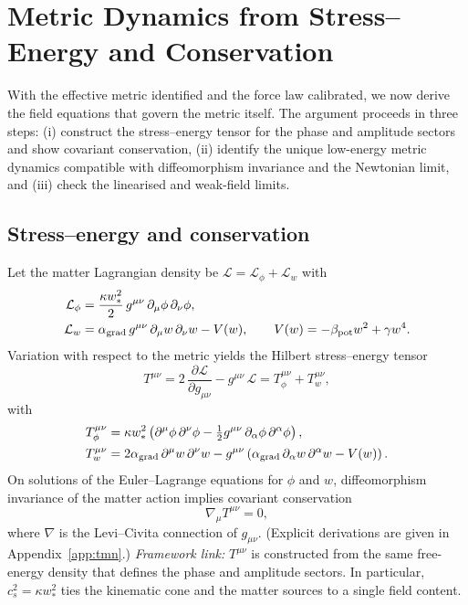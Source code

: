\documentclass[11pt]{article}
\begin{document}
\section{Metric Dynamics from Stress--Energy and Conservation}
With the effective metric identified and the force law calibrated, we now derive the field equations that govern the metric itself. The argument proceeds in three steps: (i) construct the stress--energy tensor for the phase and amplitude sectors and show covariant conservation, (ii) identify the unique low-energy metric dynamics compatible with diffeomorphism invariance and the Newtonian limit, and (iii) check the linearised and weak-field limits.

\subsection{Stress--energy and conservation}
Let the matter Lagrangian density be $\mathcal L=\mathcal L_\phi+\mathcal L_w$ with
\begin{align}
  \mathcal L_\phi &= \frac{\kappa w_*^2}{2}\,g^{\mu\nu}\,\partial_\mu\phi\,\partial_\nu\phi,\\
  \mathcal L_w &= \alpha_{\rm grad}\,g^{\mu\nu}\,\partial_\mu w\,\partial_\nu w - V(w),\qquad V(w)=-\beta_{\rm pot}w^2+\gamma w^4.
\end{align}
Variation with respect to the metric yields the Hilbert stress--energy tensor
\begin{equation}
  T^{\mu\nu} = 2\,\frac{\partial \mathcal L}{\partial g_{\mu\nu}} - g^{\mu\nu}\,\mathcal L 
  = T^{\mu\nu}_{\phi}+T^{\mu\nu}_{w},
\end{equation}
with
\begin{align}
  T^{\mu\nu}_{\phi} &= \kappa w_*^2\left(\partial^{\mu}\phi\,\partial^{\nu}\phi - \tfrac12 g^{\mu\nu}\,\partial_\alpha\phi\,\partial^{\alpha}\phi\right),\\
  T^{\mu\nu}_{w} &= 2\alpha_{\rm grad}\,\partial^{\mu}w\,\partial^{\nu}w - g^{\mu\nu}\left(\alpha_{\rm grad}\,\partial_\alpha w\,\partial^{\alpha}w - V(w)\right).
\end{align}
On solutions of the Euler--Lagrange equations for $\phi$ and $w$, diffeomorphism invariance of the matter action implies covariant conservation
\begin{equation}
  \nabla_\mu T^{\mu\nu} = 0,
\end{equation}
where $\nabla$ is the Levi--Civita connection of $g_{\mu\nu}$. (Explicit derivations are given in Appendix~\ref{app:tmn}.)
\noindent \emph{Framework link:} $T^{\mu\nu}$ is constructed from the same free-energy density that defines the phase and amplitude sectors. In particular, $c_s^2=\kappa w_*^2$ ties the kinematic cone and the matter sources to a single field content.
\end{document}

